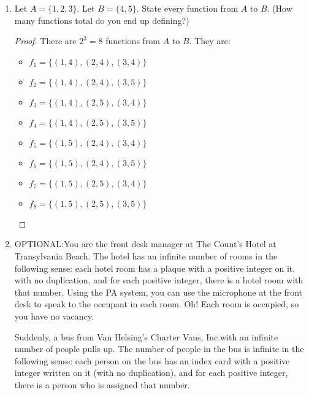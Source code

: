 \documentclass{article}
\begin{document}
\begin{enumerate}
\begin{proof}
              Therefore, $f$ is a function from $A$ to $B$.
          \end{proof}

          \newpage

    \item Let $A = \{1,2,3\}$. Let $B = \{4,5\}$. State every function from $A$ to $B$.
          (How many functions total do you end up defining?)

          \begin{proof}
              There are $2^3 = 8$ functions from $A$ to $B$. They are:
              \begin{itemize}
                  \item $f_1 = \{(1,4),(2,4),(3,4)\}$
                  \item $f_2 = \{(1,4),(2,4),(3,5)\}$
                  \item $f_3 = \{(1,4),(2,5),(3,4)\}$
                  \item $f_4 = \{(1,4),(2,5),(3,5)\}$
                  \item $f_5 = \{(1,5),(2,4),(3,4)\}$
                  \item $f_6 = \{(1,5),(2,4),(3,5)\}$
                  \item $f_7 = \{(1,5),(2,5),(3,4)\}$
                  \item $f_8 = \{(1,5),(2,5),(3,5)\}$
              \end{itemize}
          \end{proof}

          \newpage

    \item OPTIONAL:\@ You are the front desk manager at The Count's Hotel at Transylvania
          Beach. The hotel has an infinite number of rooms in the following sense: each
          hotel room has a plaque with a positive integer on it, with no duplication, and
          for each positive integer, there is a hotel room with that number. Using the PA
          system, you can use the microphone at the front desk to speak to the occupant
          in each room. Oh! Each room is occupied, so you have no vacancy.

          Suddenly, a bus from Van Helsing's Charter Vans, Inc.\@ with an infinite number
          of people pulls up. The number of people in the bus is infinite in the
          following sense: each person on the bus has an index card with a positive
          integer written on it (with no duplication), and for each positive integer,
          there is a person who is assigned that number.


\end{enumerate}
\end{document}
